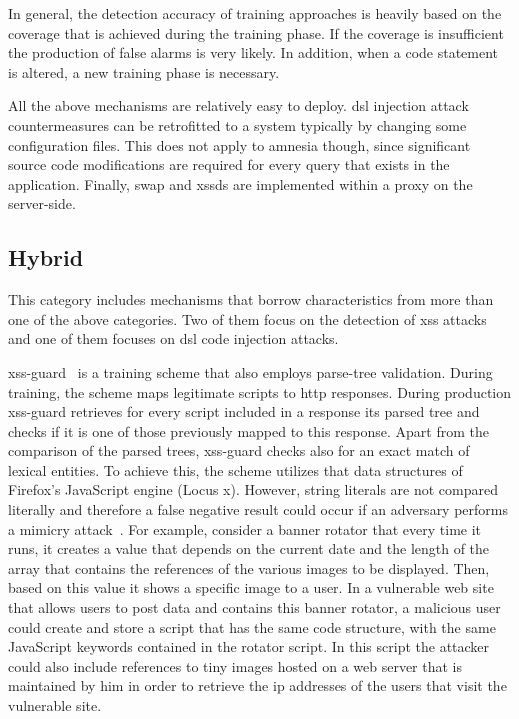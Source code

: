 \documentclass[conference]{IEEEtran}
\begin{document}
In general, the detection accuracy of training approaches is
heavily based on the coverage that is achieved during the
training phase. If the coverage is insufficient the
production of false alarms is very likely.
In addition, when a code statement is altered, a new
training phase is necessary.

All the above mechanisms are relatively easy to deploy.
{\sc dsl} injection attack countermeasures
can be retrofitted to a system typically by changing
some configuration files. This does not apply
to {\sc amnesia} though, since significant source code
modifications are required for every query that exists
in the application. Finally, {\sc swap} and {\sc xssds}
are implemented within a proxy on the server-side.

\subsection{Hybrid}
\label{sec:hybrid}

This category includes mechanisms that borrow
characteristics from more than one of the above categories.
Two of them focus on the detection of {\sc xss}
attacks and one of them focuses on {\sc dsl} code
injection attacks.

{\sc xss-guard}~\cite{BV08} is a training scheme that also employs
parse-tree validation. During training, the scheme maps legitimate
scripts to {\sc http} responses. During production {\sc xss-guard}
retrieves for every script included in a response its parsed tree and
checks if it is one of those previously mapped to this response. Apart
from the comparison of the parsed trees, {\sc xss-guard} checks also
for an exact match of lexical entities. To achieve this, the scheme
utilizes that data structures of Firefox's JavaScript engine (Locus
{\sc x}). However, string literals are not compared literally and
therefore a false negative result could occur if an adversary performs
a mimicry attack~\cite{WS02}. For example, consider a banner rotator
that every time it runs, it creates a value that depends on the
current date and the length of the array that contains the references
of the various images to be displayed. Then, based on this value it
shows a specific image to a user. In a vulnerable web site that allows
users to post data and contains this banner rotator, a malicious user
could create and store a script that has the same code structure, with
the same JavaScript keywords contained in the rotator script.
In this script the attacker could also include references to tiny
images hosted on a web server that is maintained by him in order to
retrieve the {\sc ip} addresses of the users that visit the vulnerable
site.
\end{document}
